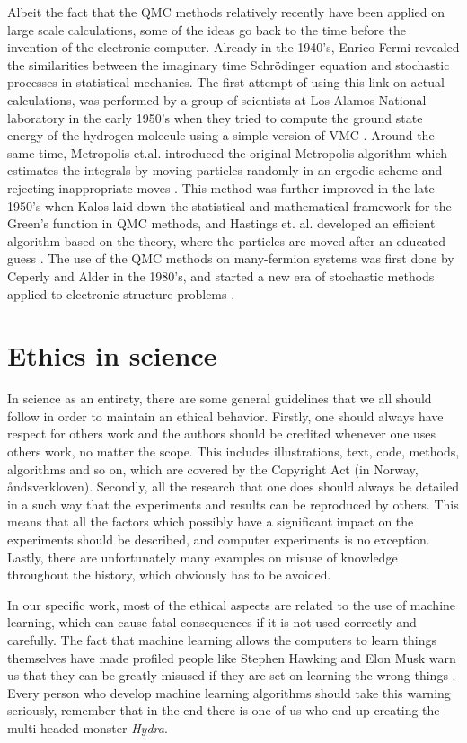 Albeit the fact that the QMC methods relatively recently have been applied on large scale calculations, some of the ideas go back to the time before the invention of the electronic computer. Already in the 1940's, Enrico Fermi revealed the similarities between the imaginary time Schrödinger equation and stochastic processes in statistical mechanics. The first attempt of using this link on actual calculations, was performed by a group of scientists at Los Alamos National laboratory in the early 1950's when they tried to compute the ground state energy of the hydrogen molecule using a simple version of VMC \cite{bajdich_electronic_2010}. Around the same time, Metropolis et.al. introduced the original Metropolis algorithm which estimates the integrals by moving particles randomly in an ergodic scheme and rejecting inappropriate moves \cite{metropolis_monte_1949}. This method was further improved in the late 1950's when Kalos laid down the statistical and mathematical framework for the Green's function in QMC methods, and Hastings et. al. developed an efficient algorithm based on the theory, where the particles are moved after an educated guess \cite{hastings_monte_1970}. The use of the QMC methods on many-fermion systems was first done by Ceperly and Alder in the 1980's, and started a new era of stochastic methods applied to electronic structure problems \cite{ceperley_quantum_1986}. 

\section{Ethics in science}
In science as an entirety, there are some general guidelines that we all should follow in order to maintain an ethical behavior. Firstly, one should always have respect for others work and the authors should be credited whenever one uses others work, no matter the scope. This includes illustrations, text, code, methods, algorithms and so on, which are covered by the Copyright Act (in Norway, åndsverkloven). Secondly, all the research that one does should always be detailed in a such way that the experiments and results can be reproduced by others. This means that all the factors which possibly have a significant impact on the experiments should be described, and computer experiments is no exception. Lastly, there are unfortunately many examples on misuse of knowledge throughout the history, which obviously has to be avoided.

In our specific work, most of the ethical aspects are related to the use of machine learning, which can cause fatal consequences if it is not used correctly and carefully. The fact that machine learning allows the computers to learn things themselves have made profiled people like Stephen Hawking and Elon Musk warn us that they can be greatly misused if they are set on learning the wrong things \cite{cellan-jones_hawking:_2014, vance_elon_2015}. Every person who develop machine learning algorithms should take this warning seriously, remember that in the end there is one of us who end up creating the multi-headed monster \textit{Hydra}.

